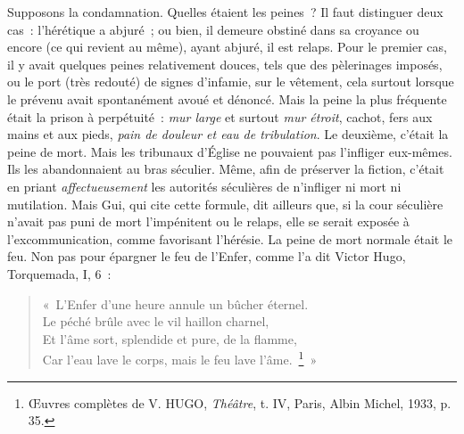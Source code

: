 \documentclass[french,twoside]{book} %
\begin{document}
Supposons la condamnation. Quelles étaient les peines ? Il faut distinguer deux cas : l’hérétique a abjuré ; ou bien, il demeure  
\label{p106} obstiné dans sa croyance ou encore (ce qui revient au même), ayant abjuré, il est relaps. Pour le premier cas, il y avait quelques peines relativement douces, tels que des pèlerinages imposés, ou le port (très redouté) de signes d’infamie, sur le vêtement, cela surtout lorsque le prévenu avait spontanément avoué et dénoncé. Mais la peine la plus fréquente était la prison à perpétuité : \emph{mur large} et surtout \emph{mur étroit}, cachot, fers aux mains et aux pieds, \emph{pain de douleur et eau de tribulation}. Le deuxième, c’était la peine de mort. Mais les tribunaux d’Église ne pouvaient pas l’infliger eux-mêmes. Ils les abandonnaient au bras séculier. Même, afin de préserver la fiction, c’était en priant \emph{affectueusement} les autorités séculières de n’infliger ni mort ni mutilation. Mais Gui, qui cite cette formule, dit ailleurs que, si la cour séculière n’avait pas puni de mort l’impénitent ou le relaps, elle se serait exposée à l’excommunication, comme favorisant l’hérésie. La peine de mort normale était le feu. Non pas pour épargner le feu de l’Enfer, comme l’a dit Victor Hugo, Torquemada, I, 6 :\par


\begin{verse}
« L’Enfer d’une heure annule un bûcher éternel.\\
Le péché brûle avec le vil haillon charnel,\\
Et l’âme sort, splendide et pure, de la flamme,\\
Car l’eau lave le corps, mais le feu lave l’âme. \footnote{ Œuvres complètes de V. HUGO, {\itshape Théâtre}, t. IV, Paris, Albin Michel, 1933, p. 35.} »\\
\end{verse}
\end{document}
